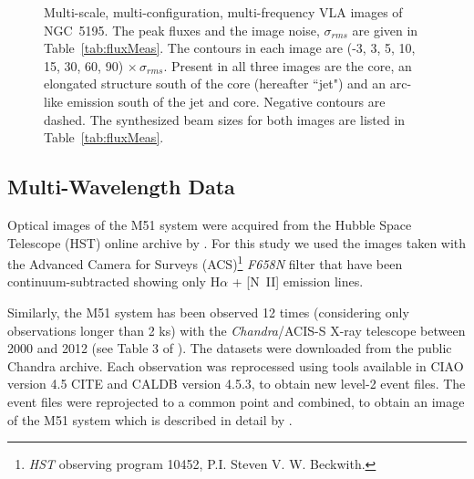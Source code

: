 \documentclass[fleqn,usenatbib]{mnras}
\def\tab{Table}
\begin{document}
\begin{figure}
\caption{Multi-scale, multi-configuration, multi-frequency VLA images of NGC~5195. The peak fluxes and the image noise, $\sigma_{rms}$ are given in \tab~\ref{tab:fluxMeas}. The contours in each image are (-3, 3, 5, 10, 15, 30, 60, 90) $\times\, \sigma_{rms}$. Present in all three images are the core, an elongated structure south of the core (hereafter ``jet") and an arc-like emission south of the jet and core. Negative contours are dashed. The synthesized beam sizes for both images are listed in \tab~\ref{tab:fluxMeas}.}
\label{fig:VLAMaps}
\end{figure}


\subsection{Multi-Wavelength Data}

Optical images of the M51 system were acquired from the Hubble Space Telescope (HST) online archive by \cite{Rampadarathetal15}. For this study we used the images taken with the Advanced Camera for Surveys (ACS)\footnote{\textit{HST} observing program 10452, P.I. Steven V. W. Beckwith.} \textit{F658N} filter that have been continuum-subtracted showing only H$\alpha$ + [N~II] emission lines.

{Similarly, the M51 system has been observed 12 times  (considering only observations longer than 2 ks) with the \textit{Chandra}/ACIS-S X-ray telescope between 2000 and 2012 (see Table 3 of \citealt{Rampadarathetal15}). The datasets were downloaded from the public Chandra archive. Each observation was reprocessed using tools available in CIAO version 4.5 CITE and CALDB version 4.5.3, to obtain new level-2 event files. The event files were reprojected to a common point and combined, to obtain an image of the M51 system which is described in detail by \cite{Rampadarathetal15}.}
\end{document}
